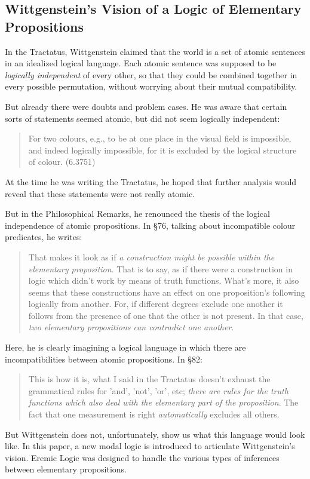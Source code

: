 \subsection{Wittgenstein's Vision of a Logic of Elementary Propositions}
In the Tractatus\cite{wittgenstein-tractatus}, Wittgenstein claimed that the world is a set of atomic sentences in an idealized logical language. 
Each atomic sentence was supposed to be \emph{logically independent} of every other, so that they could be combined together in every possible permutation, without worrying about their mutual compatibility.

But already there were doubts and problem cases. 
He was aware that certain sorts of statements seemed atomic, but did not seem logically independent:
\begin{quote}
For two colours, e.g., to be at one place in the visual field is impossible, and indeed logically impossible, for it is excluded by the logical structure of colour. (6.3751)
\end{quote}
At the time he was writing the Tractatus, he hoped that further analysis would reveal that these statements were not really atomic. 

But in the Philosophical Remarks\cite{wittgenstein-remarks}, he renounced the thesis of the logical independence of atomic propositions. 
In \S 76, talking about incompatible colour predicates, he writes:
\begin{quote}
That makes it look as if \emph{a construction might be possible within the elementary proposition}. That is to say, as if there were a construction in logic which didn't work by means of truth functions. 
What's more, it also seems that these constructions have an effect on one proposition's following logically from another. 
For, if different degrees exclude one another it follows from the presence of one that the other is not present. 
In that case, \emph{two elementary propositions can contradict one another}.
\end{quote}
Here, he is clearly imagining a logical language in which there are incompatibilities between atomic propositions. In \S 82:
\begin{quote}
This is how it is, what I said in the Tractatus doesn't exhaust the grammatical rules for 'and', 'not', 'or', etc; \emph{there are rules for the truth functions which also deal with the elementary part of the proposition}.
The fact that one measurement is right \emph{automatically} excludes all others. 
\end{quote}
But Wittgenstein does not, unfortunately, show us what this language would look like.
In this paper, a new modal logic is introduced to articulate Wittgenstein's vision. 
Eremic Logic was designed to handle the various types of inferences between elementary propositions.

